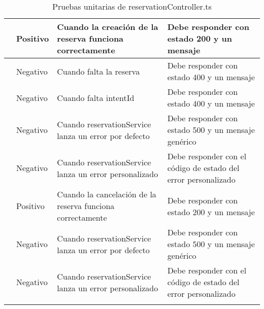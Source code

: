 \begin{small}
\begin{longtable}[H]{|>{\centering\arraybackslash}m{3cm}|>{\centering\arraybackslash}m{2cm}|>{\centering\arraybackslash}m{3cm}|>{\centering\arraybackslash}m{4cm}|}
		\multirow{4}{4cm}{POST /}    & Positivo              & Cuando la creación de la reserva funciona correctamente    & Debe responder con estado 200 y un mensaje                     \\
		\cline{2-4}
		                             & Negativo              & Cuando falta la reserva                                    & Debe responder con estado 400 y un mensaje                     \\
		\cline{2-4}
		                             & Negativo              & Cuando falta intentId                                      & Debe responder con estado 400 y un mensaje                     \\
		\cline{2-4}
		                             & Negativo              & Cuando reservationService lanza un error por defecto       & Debe responder con estado 500 y un mensaje genérico            \\
		\cline{2-4}
		                             & Negativo              & Cuando reservationService lanza un error personalizado     & Debe responder con el código de estado del error personalizado \\
		\hline

		\multirow{3}{4cm}{PUT /:id}  & Positivo              & Cuando la cancelación de la reserva funciona correctamente & Debe responder con estado 200 y un mensaje                     \\
		\cline{2-4}
		                             & Negativo              & Cuando reservationService lanza un error por defecto       & Debe responder con estado 500 y un mensaje genérico            \\
		\cline{2-4}
		                             & Negativo              & Cuando reservationService lanza un error personalizado     & Debe responder con el código de estado del error personalizado \\
		\hline
		\caption{Pruebas unitarias de reservationController.ts}
	\end{longtable}
\end{small}

